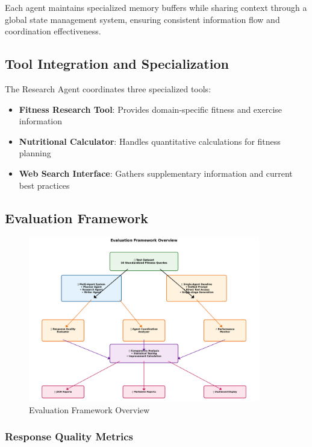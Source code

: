 \documentclass[conference]{IEEEtran}
\begin{document}
Each agent maintains specialized memory buffers while sharing context through a global state management system, ensuring consistent information flow and coordination effectiveness.

\subsection{Tool Integration and Specialization}

The Research Agent coordinates three specialized tools:

\begin{itemize}
\item \textbf{Fitness Research Tool}: Provides domain-specific fitness and exercise information
\item \textbf{Nutritional Calculator}: Handles quantitative calculations for fitness planning
\item \textbf{Web Search Interface}: Gathers supplementary information and current best practices
\end{itemize}

\subsection{Evaluation Framework}

\begin{figure}[htbp]
\centering
\includegraphics[width=0.9\textwidth]{diagrams/evaluation_framework.png}
\caption{Evaluation Framework Overview}
\label{fig:evaluation_framework}
\end{figure}

\subsubsection{Response Quality Metrics}
\end{document}

